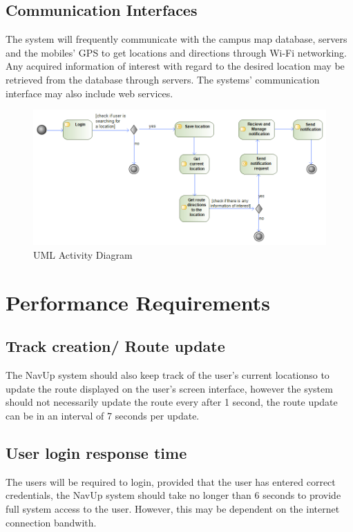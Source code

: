 \subsection{Communication Interfaces}
The system will frequently communicate with the campus map database, servers and the mobiles’ GPS to get locations and directions through Wi-Fi networking. Any acquired information of interest with regard to the desired location may be retrieved from the database through servers. The systems’ communication interface may also include web services.
	
\begin{figure}[H]
\includegraphics[width=\textwidth]{ActivityDiagram}
\caption{UML Activity Diagram}
\end{figure}
	
\section{Performance Requirements}
\subsection{Track creation/ Route update}
The NavUp system should also keep track of the user's current locationso to update the route displayed on the user's screen interface, however the system should not necessarily update the route every after 1 second, the route update can be in an interval of 7 seconds per update.

\subsection{User login response time}
The users will be required to login, provided that the user has entered correct credentials, the NavUp system should take no longer
than 6 seconds to provide full system access to the user. However, this may be dependent on the internet connection bandwith.
	
